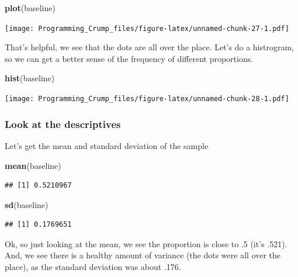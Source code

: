 \documentclass[]{book}
\newenvironment{Shaded}{\begin{snugshade}}{\end{snugshade}}
\newcommand{\KeywordTok}[1]{\textcolor[rgb]{0.13,0.29,0.53}{\textbf{{#1}}}}
\newcommand{\NormalTok}[1]{{#1}}
\theoremstyle{definition}
\theoremstyle{definition}
\theoremstyle{definition}
\theoremstyle{remark}
\begin{document}
\begin{Shaded}
\begin{Highlighting}[]
\KeywordTok{plot}\NormalTok{(baseline)}
\end{Highlighting}
\end{Shaded}

\texttt{[image: Programming\_Crump\_files/figure-latex/unnamed-chunk-27-1.pdf]}

That's helpful, we see that the dots are all over the place. Let's do a
histrogram, so we can get a better sense of the frequency of different
proportions.

\begin{Shaded}
\begin{Highlighting}[]
\KeywordTok{hist}\NormalTok{(baseline)}
\end{Highlighting}
\end{Shaded}

\texttt{[image: Programming\_Crump\_files/figure-latex/unnamed-chunk-28-1.pdf]}

\subsubsection{Look at the descriptives}\label{look-at-the-descriptives}

Let's get the mean and standard deviation of the sample

\begin{Shaded}
\begin{Highlighting}[]
\KeywordTok{mean}\NormalTok{(baseline)}
\end{Highlighting}
\end{Shaded}

\begin{verbatim}
## [1] 0.5210967
\end{verbatim}

\begin{Shaded}
\begin{Highlighting}[]
\KeywordTok{sd}\NormalTok{(baseline)}
\end{Highlighting}
\end{Shaded}

\begin{verbatim}
## [1] 0.1769651
\end{verbatim}

Ok, so just looking at the mean, we see the proportion is close to .5
(it's .521). And, we see there is a healthy amount of variance (the dots
were all over the place), as the standard deviation was about .176.
\end{document}
